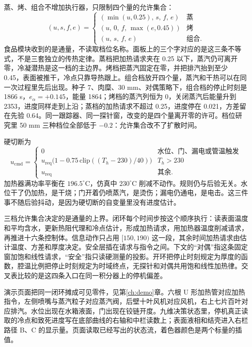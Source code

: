 蒸、烤、组合不增加执行器，只限制四个量的允许集合：
\begin{equation}
\label{eq:mode}
(u,s,f,e)=
\begin{cases}
(\min(u,0.25),\,s,\,f,\,e) & \text{蒸}\\
(u,\,0,\,f,\,\max(e,0.45)) & \text{烤}\\
(u,\,s,\,f,\,e) & \text{组合}.
\end{cases}
\end{equation}
食品模块收到的是通量，不读取档位名称。面板上的三个字对应的是这三条不等式，不是三套独立的传热定律。蒸档把加热请求夹在 0.25 以下，蒸汽仍可离开零，冷凝潜热是这一档的主边界。烤档把蒸汽固定在零，并把排汽抬到至少 0.45，表面被推干，冷点只靠导热跟上。组合档放开四个量，蒸汽和干热可以在同一次过程里先后出现。种子 7、肉糜、30 mm、对偶策略下，组合档的停止时刻是 1866 s，\(e_{\alpha}=+0.145\)，能量 1864；烤档的蒸汽列恒为 0，关闭蒸汽后能量升到 2353，进度同样走到上沿；蒸档的加热请求不超过 0.25，进度停在 0.021，方差留在先验 0.64。同一跟踪器、同一探针窗，改变的是四个量离开零的许可。档位研究里 50 mm 三种档位全部低于 \(-0.2\)：允许集合改不了扩散时间。

硬切断为
\begin{equation}
\label{eq:hard}
u_{\mathrm{cmd}}=
\begin{cases}
0 & \text{水位、门、漏电或管温触发}\\
u_{\mathrm{req}}\big(1-0.75\,\mathrm{clip}((T_h-230)/40)\big) & T_h>230\\
u_{\mathrm{req}} & \text{其余}.
\end{cases}
\end{equation}
加热器满功率平衡在 \(196.5^\circ\mathrm{C}\)，仿真中 \(230^\circ\mathrm{C}\) 削减不动作。规则仍与后验无关。水位干了仍加热，是干烧；门开着仍喷蒸汽，是烫伤；漏电仍通电，是电击。这三件事不随后验抖动，是因为硬切断的自变量里没有进度估计。

三档允许集合决定的是通量的上界。闭环每个时间步按这个顺序执行：读表面温度和平均含水，更新热阻代理和冷点估计，形成加热请求，用加热器温度削减请求，再推进十六条控制体。信息动作只占用 \([150,190)\) 这一段，其余时间加热请求由估计温度、方差和厚度决定。安全层插在请求与指令之间。下文的“对偶”指这条固定窗加饱和线性请求，“安全”指只读硬测量的投影。开环把停止时刻规定为厚度的函数，腔温比例把停止时刻规定为时域终点，无探针和对偶共用饱和线性加热律。交叉表比较的是这四条入口在同一积分器上的停机偏差。

演示页面把同一闭环摊成可见零件，见第\ref{ch:demo}章。六根 U 形加热管对应加热指令，左侧喷嘴与蒸汽粒子对应蒸汽阀，后壁十叶风机对应风机，右上七片百叶对应排汽。水位出现在水箱液面，门出现在铰链开度。九维决策状态里，停机真正读取的冷点和致死进度写在底部曲线的右轴和中栏读数上；表面液相和结壳进入右栏路径 B、C 的显示量。页面读取已经写出的状态流，着色器颜色是两个标量的插值。

